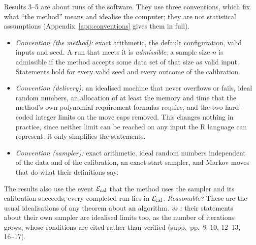 Results 3--5 are about runs of the software. They use three conventions, which fix what ``the method'' means and
idealise the computer; they are not statistical assumptions (Appendix~\ref{app:conventions} gives them in full).
\begin{itemize}[leftmargin=1.5em,itemsep=1pt]
  \item {}\label{asm:C1}\emph{Convention  (the method):} exact arithmetic, the default configuration,
    valid inputs and seed. A run that meets it is \emph{admissible}; a sample size $n$ is admissible if the method accepts
    some data set of that size as valid input. Statements hold for every valid seed and every outcome of the calibration.
  \item {}\label{asm:C2p}\emph{Convention  (delivery):} an idealised
    machine that never overflows or fails, ideal random numbers, an allocation of at least the memory and time that the
    method's own polynomial requirement formulas require, and the two hard-coded integer limits on the move caps removed.
    This changes nothing in practice, since neither limit can be reached on any input the R language can represent; it
    only simplifies the statements.
  \item {}\label{asm:C3}\emph{Convention  (sampler):} exact arithmetic, ideal random numbers
    independent of the data and of the calibration, an exact start sampler, and Markov moves that do what their definitions
    say.
\end{itemize}
The results also use the event $\mathcal E_{\mathrm{cal}}$ that the method uses the sampler and its calibration succeeds; every completed run
lies in $\mathcal E_{\mathrm{cal}}$. \emph{Reasonable?} These are the usual idealisations of any theorem about an algorithm. \emph{vs \SL:}
their statements about their own sampler are idealised limits too, as the number of iterations
grows, whose conditions are cited rather than verified (supp.\ pp.~9--10, 12--13, 16--17).
